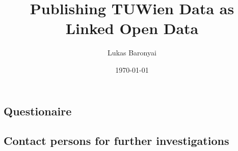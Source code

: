 \documentclass[pdftex,a4paper,10pt]{article}
\begin{document}
\pagestyle{plain}
\setlength{\tabcolsep}{10pt}
\title{Publishing TUWien Data as Linked Open Data}
\author{Lukas Baronyai}
\date{\today}
\maketitle					%
\tableofcontents 	%
\cleardoublepage %
\listoffigures









\cleardoublepage
{}
{}


\newpage

\begin{appendices}
	\subsection{Questionaire}
	
	\newpage
	\subsection{Contact persons for further investigations}
	\newpage
\end{appendices}
\end{document}
